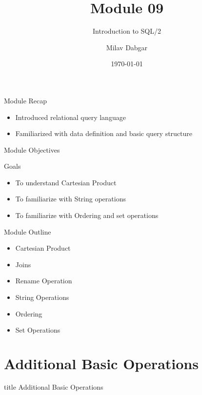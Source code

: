 \documentclass[aspectratio=169, xcolor=dvipsnames]{beamer}
\title{Module 09}
\subtitle{Introduction to SQL/2}
\author{Milav Dabgar}
\institute{www.milav.in}
\date{\today}
\begin{document}
\begin{frame}
    \titlepage
\end{frame}

\begin{frame}{Module Recap}
    \begin{itemize}[<+->]
        \item Introduced relational query language
        \item Familiarized with data definition and basic query structure
    \end{itemize}
\end{frame}

\begin{frame}{Module Objectives}
    \begin{block}{Goals}
        \begin{itemize}[<+->]
            \item To understand Cartesian Product
            \item To familiarize with String operations
            \item To familiarize with Ordering and set operations
        \end{itemize}
    \end{block}
\end{frame}

\begin{frame}{Module Outline}
    \begin{itemize}[<+->]
        \item Cartesian Product
        \item Joins
        \item Rename Operation
        \item String Operations
        \item Ordering
        \item Set Operations
    \end{itemize}
\end{frame}

\section{Additional Basic Operations}

\begin{frame}
  \vfill
  \centering
  \begin{beamercolorbox}[sep=8pt,center,shadow=true,rounded=true]{title}
    Additional Basic Operations\par%
  \end{beamercolorbox}
  \vfill
\end{frame}
\end{document}
